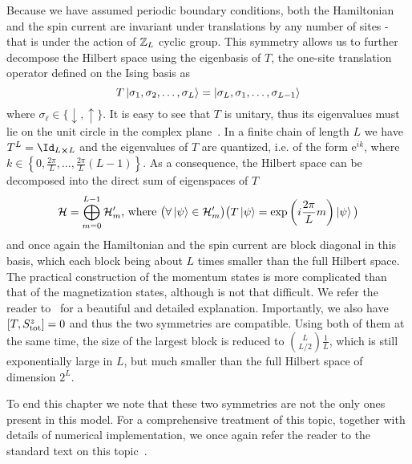 Because we have assumed periodic boundary conditions, both the Hamiltonian and the spin current
are invariant under translations by any number of sites - that is under the action of \(\mathbb{Z}_L\) cyclic group.
This symmetry allows us to further decompose the Hilbert space
using the eigenbasis of \(T\), the one-site translation operator defined on the Ising basis as
\begin{equation}
    T \ket{\sigma_1,\sigma_2,\ldots,\sigma_L} = \ket{\sigma_L,\sigma_1,\ldots,\sigma_{L-1}}
\end{equation}
where \(\sigma_{\ell} \in \{\downarrow, \uparrow\}\). It is easy to see that \(T\) is unitary,
thus its eigenvalues must lie on the unit circle in the complex plane~\autocite{Horn2012}.
In a finite chain of length \(L\) we have \(T^L = \Id_{L\cross L}\) and the eigenvalues of \(T\) are
quantized, i.e. of the form \(\mathrm{e}^{i k}\), where \(k \in \left\{0,\frac{2\pi}{L},\ldots,\frac{2\pi}{L}(L-1)\right\}\).
As a consequence, the Hilbert space can be decomposed into the direct sum of eigenspaces of \(T\)
\begin{equation}
    \mathcal{H} = \bigoplus_{m=0}^{L-1} \mathcal{H}^{\prime}_m \text{, where } \big(\forall \ket{\psi} \in \mathcal{H}^{\prime}_m \big) \big(T \ket{\psi} = \exp\left({i \frac{2\pi}{L}m}\right) \ket{\psi}\big)
\end{equation}
and once again the Hamiltonian and the spin current are block diagonal in this basis, which each block being
about \(L\) times smaller than the full Hilbert space.
The practical construction of the momentum states is more complicated than that of the magnetization states,
although is not that difficult. We refer the reader to~\textcite{Sandvik2010} for a beautiful and detailed explanation.
Importantly, we also have \(\comm{T}{\Sz_{\mathrm{tot}}}=0\) and thus the two symmetries are compatible.
Using both of them at the same time, the size of the largest block is reduced to \(\binom{L}{L/2}\frac{1}{L}\), which is
still exponentially large in \(L\), but much smaller than the full Hilbert space of dimension \(2^L\).

To end this chapter we note that these two symmetries are not the only ones present in this model.
For a comprehensive treatment of this topic, together with details of numerical implementation, we 
once again refer the reader to the standard text on this topic~\autocite{Sandvik2010}.
